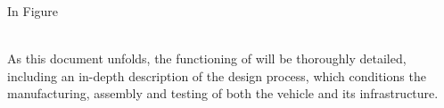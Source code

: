 
In Figure %

\\

As this document unfolds, the functioning of \Nombre will be thoroughly detailed, including an in-depth description of the design process, which conditions the manufacturing, assembly and testing of both the vehicle and its infrastructure.